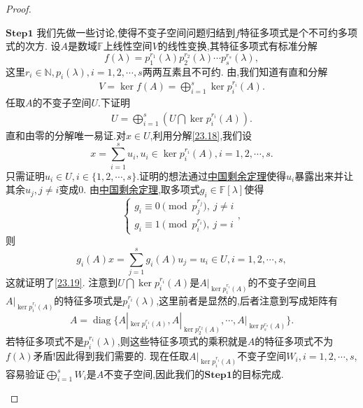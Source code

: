 \documentclass[../../main.tex]{subfiles}
\begin{document}
\begin{proof}
\begin{enumerate}[(1)]
$\mathbf{Step}\mathbf{1}$ 我们先做一些讨论,使得不变子空间问题归结到$f$特征多项式是个不可约多项式的次方.
设$A$是数域$\mathbb{F}$上线性空间$V$的线性变换,其特征多项式有标准分解
$$f(\lambda)=p_1^{r_1}(\lambda)p_2^{r_2}(\lambda)\cdots p_s^{r_s}(\lambda),$$
这里$r_i\in\mathbb{N},p_i(\lambda),i=1,2,\cdots,s$两两互素且不可约.
由,我们知道有直和分解
\begin{align}
V=\ker f(A)=\bigoplus_{i=1}^s\ker p_i^{r_i}(A)\label{23.18}.
\end{align}
任取$A$的不变子空间$U$.下证明
\begin{align}
U=\bigoplus_{i=1}^s\left(U\bigcap\ker p_i^{r_i}(A)\right)\label{23.19}.
\end{align}
直和由零的分解唯一易证.对$x\in U$,利用分解\eqref{23.18},我们设
$$x=\sum_{i=1}^su_i,u_i\in\ker p_i^{r_i}(A),i=1,2,\cdots,s.$$
只需证明$u_i\in U,i\in\{1,2,\cdots,s\}$.证明的想法通过\hyperref[theorem:中国剩余定理(多项式版)]{中国剩余定理}使得$u_i$暴露出来并让其余$u_j,j\neq i$变成$0$.
由\hyperref[theorem:中国剩余定理(多项式版)]{中国剩余定理},取多项式$g_i\in\mathbb{F}[\lambda]$使得
$$\begin{cases}g_i\equiv0\pmod{p_j^{r_j}},\ j\neq i\\g_i\equiv1\pmod{p_i^{r_i}},\ j=i\end{cases},$$
则
$$g_i(A)x=\sum_{j=1}^sg_i(A)u_j=u_i\in U,i=1,2,\cdots,s,$$
这就证明了\eqref{23.19}.
注意到$U\bigcap\ker p_i^{r_i}(A)$是$A|_{\ker p_i^{r_i}(A)}$的不变子空间且$A|_{\ker p_i^{r_i}(A)}$的特征多项式是$p_i^{r_i}(\lambda)$,这里前者是显然的,后者注意到写成矩阵有
$$A=\operatorname{diag}\{A|_{\ker p_1^{r_1}(A)},A|_{\ker p_2^{r_2}(A)},\cdots,A|_{\ker p_s^{r_s}(A)}\}.$$
若特征多项式不是$p_i^{r_i}(\lambda)$,则这些特征多项式的乘积就是$A$的特征多项式不为$f(\lambda)$矛盾!因此得到我们需要的.
现在任取$A|_{\ker p_i^{r_i}(A)}$不变子空间$W_i,i=1,2,\cdots,s$,容易验证$\bigoplus_{i=1}^sW_i$是$A$不变子空间,因此我们的$\mathbf{Step}\mathbf{1}$的目标完成.


\end{enumerate}
\end{proof}
\end{document}
